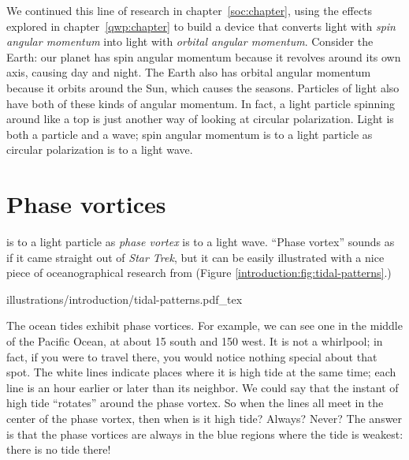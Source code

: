 We continued this line of research in chapter~\ref{soc:chapter}, using the effects explored in chapter~\ref{qwp:chapter} to build a device that converts light with \emph{spin angular momentum} into light with \emph{orbital angular momentum}.
Consider the Earth: our planet has spin angular momentum because it revolves around its own axis, causing day and night.
The Earth also has orbital angular momentum because it orbits around the Sun, which causes the seasons.
Particles of light also have both of these kinds of angular momentum.
In fact, a light particle spinning around like a top is just another way of looking at circular polarization.
Light is both a particle and a wave; spin angular momentum is to a light particle as circular polarization is to a light wave.

\section*{Phase vortices}

 is to a light particle as \emph{phase vortex} is to a light wave.
``Phase vortex'' sounds as if it came straight out of \emph{Star Trek}, but it can be easily illustrated with a nice piece of oceanographical research from  \cite{Ray2006} (Figure \ref{introduction:fig:tidal-patterns}.)

\begin{figure*}[tb]
  \forcerectofloat\centering
  {illustrations/introduction/tidal-patterns.pdf_tex}
  \caption{Tides in the world's oceans.
Along each white line, it is high tide at exactly the same time, and neighboring white lines' high tides are separated by one hour.
The colored spaces represent the tide strength (blue is weaker and red is stronger), and the amplitude is indicated in centimeters.
(Public domain image.
Credit to  Goddard Space Flight Center;  Jet Propulsion Laboratory; Scientific Visualization Studio; Television Production .
Special thanks to Dr.\ Richard Ray, Space Geodesy branch, )}
  \label{introduction:fig:tidal-patterns}
\end{figure*}

The ocean tides exhibit phase vortices.
For example, we can see one in the middle of the Pacific Ocean, at about 15\mbox{\textdegree} south and 150\mbox{\textdegree} west.
It is not a whirlpool; in fact, if you were to travel there, you would notice nothing special about that spot.
The white lines indicate places where it is high tide at the same time; each line is an hour earlier or later than its neighbor.
We could say that the instant of high tide ``rotates'' around the phase vortex.
So when the lines all meet in the center of the phase vortex, then when is it high tide? Always? Never? The answer is that the phase vortices are always in the blue regions where the tide is weakest: there is no tide there!

